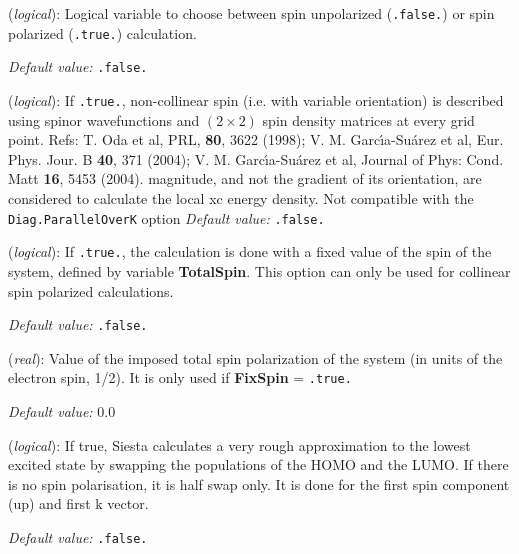 \documentclass[11pt]{article}
\begin{document}
\begin{description}
\itemsep 10pt
\parsep 0pt

\item[{\bf SpinPolarized}] ({\it logical}):
Logical variable to choose between spin unpolarized ({\tt .false.})
or spin polarized ({\tt .true.}) calculation.

{\it Default value:} {\tt .false.}


\item[{\bf NonCollinearSpin}] ({\it logical}):
   If {\tt .true.}, non-collinear
  spin (i.e. with variable orientation) is described using spinor 
  wavefunctions and $(2 \times 2)$ spin
  density matrices at every grid point.  Refs: T. Oda et al, PRL, {\bf
    80}, 3622 (1998); 
V. M. Garc\'{\i}a-Su\'arez et al, Eur. Phys. Jour. B {\bf 40}, 371 (2004);
V. M. Garc\'{\i}a-Su\'arez et al, Journal of
  Phys: Cond. Matt {\bf 16}, 5453 (2004). 
magnitude, and not the gradient of its orientation, are considered
to calculate the local xc energy density.
Not compatible with the {\tt  Diag.ParallelOverK} option 
{\it Default value:} {\tt .false.}


\item[{\bf FixSpin}] ({\it logical}):
If {\tt .true.}, the calculation is done with a fixed value of the
spin of the system, defined by variable  {\bf TotalSpin}.
This option can only be used for collinear spin polarized
calculations.

{\it Default value:} {\tt .false.}

\item[{\bf TotalSpin}] ({\it real}):
Value of the imposed total spin polarization of the system (in units of the
electron spin, 1/2). It is only used
if {\bf FixSpin} = {\tt .true.}

{\it Default value:} 0.0

\item[{\bf SingleExcitation}] ({\it logical}):
If true, {\sc Siesta} calculates a very rough approximation to
the lowest excited state by swapping the populations of the HOMO
and the LUMO. If there is no spin polarisation, it is half swap only.
It is done for the first spin component (up) and first k vector.

{\it Default value:} {\tt .false.}

\end{description}
\end{document}
